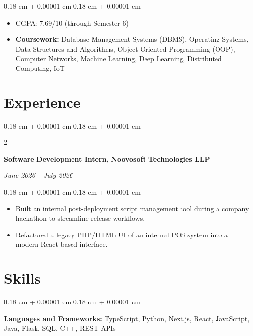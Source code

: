 \documentclass[10pt, letterpaper]{article}
\newenvironment{highlights}{
    \begin{itemize}[
        topsep=0.09 cm,
        parsep=0.09 cm,
        partopsep=0pt,
        itemsep=0pt,
        leftmargin=0.4 cm + 10pt
    ]
}{
    \end{itemize}
} %
\newenvironment{onecolentry}{
    \begin{adjustwidth}{
        0.18 cm + 0.00001 cm
    }{
        0.18 cm + 0.00001 cm
    }
}{
    \end{adjustwidth}
} %
\newenvironment{twocolentry}[2][]{
    \onecolentry
    \def\secondColumn{#2}
    \setcolumnwidth{\fill, 4.5 cm}
    \begin{paracol}{2}
}{
    \switchcolumn \raggedleft \secondColumn
    \end{paracol}
    \endonecolentry
} %
\begin{document}
        \vspace{0.02 cm}
        \begin{onecolentry}
            \begin{highlights}
                \item CGPA: 7.69/10 (through Semester 6)
                \item \textbf{Coursework:} Database Management Systems (DBMS), Operating Systems, Data Structures and Algorithms, Object-Oriented Programming (OOP), Computer Networks, Machine Learning, Deep Learning, Distributed Computing, IoT
            \end{highlights}
        \end{onecolentry}



    \section{Experience}

        \begin{twocolentry}{
        \textit{June 2026 -- July 2026}}
            \textbf{Software Development Intern, Noovosoft Technologies LLP}
        \end{twocolentry}

        \vspace{0.02 cm}
        \begin{onecolentry}
            \begin{highlights}
                \item Built an internal post-deployment script management tool during a company hackathon to streamline release workflows.
                \item Refactored a legacy PHP/HTML UI of an internal POS system into a modern React-based interface.
            \end{highlights}
        \end{onecolentry}

    \section{Skills}



        
        \begin{onecolentry}
            \textbf{Languages and Frameworks:} TypeScript, Python, Next.js, React, JavaScript, Java, Flask, SQL, C++, REST APIs
        \end{onecolentry}
\end{document}
